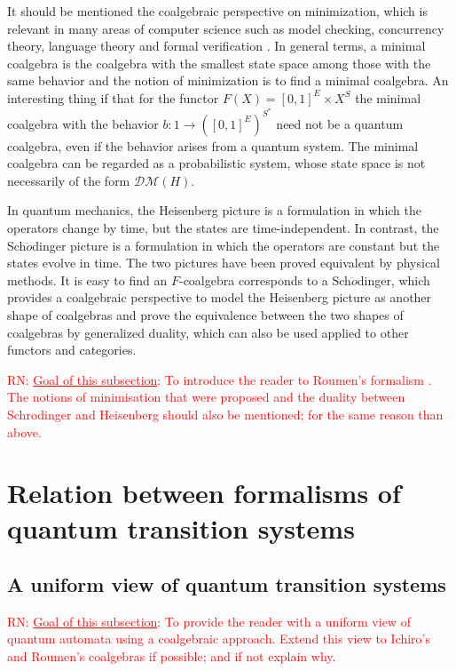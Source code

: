 \documentclass[a4paper, 11pt]{article}
\newcommand{\nevComment}[1]{\textcolor{red}{RN: #1}}
\begin{document}
It should be mentioned the coalgebraic perspective on minimization, which is relevant in many areas of computer science such as model checking, concurrency theory, language theory and formal verification \cite{JFMBSA12}. In general terms, a minimal coalgebra is the coalgebra with the smallest state space among those with the same behavior and the notion of minimization is to find a minimal coalgebra. An interesting thing if that for the functor $F(X)=[0,1]^E\times X^S$ the minimal coalgebra with the behavior $b:1\rightarrow ([0,1]^E)^{S^*}$ need not be a quantum coalgebra, even if the behavior arises from a quantum system. The minimal coalgebra can be regarded as a probabilistic system, whose state space is not necessarily of the form $\mathcal{DM}(H)$. 

In quantum mechanics, the Heisenberg picture is a formulation in which the operators change by time, but the states are time-independent. In contrast, the Sch$\ddot{o}$dinger picture is a formulation in which the operators are constant but the states evolve  in time. The two pictures  have been proved equivalent by physical methods. It is easy to find an $F$-coalgebra corresponds to a Sch$\ddot{o}$dinger, which provides a coalgebraic perspective to model the Heisenberg picture as another shape of coalgebras and  prove the equivalence between the two shapes of coalgebras by generalized duality, which can also be used applied to other functors and categories. 

\nevComment{\underline{Goal of this subsection}: To introduce the
  reader to Roumen's formalism \cite{F14}. The notions of minimisation
  that were proposed and the duality between Schrodinger and Heisenberg should
  also be mentioned; for the same reason than above.}


\section{Relation between formalisms of quantum transition systems}

\subsection{A uniform view of quantum transition systems}

\nevComment{\underline{Goal of this subsection}: To provide the reader with a uniform
view of quantum automata \cite{hirvensalo11} using a coalgebraic approach. Extend this
view to Ichiro's and Roumen's coalgebras if possible; and if not explain why.}
\end{document}

